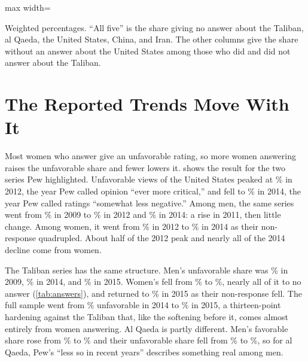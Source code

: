 \documentclass[11pt,letterpaper]{article}
\newcommand{\TableStyle}{\normalsize\setlength{\tabcolsep}{6pt}\renewcommand{\arraystretch}{1}}
\newcommand{\tablenote}[1]{\par\smallskip\begin{minipage}{\linewidth}\footnotesize #1\end{minipage}}
\begin{document}
\begin{table}[htbp]
\centering\TableStyle
\caption{Non-response across questions, by respondent}
\label{tab:same}
\begin{adjustbox}{max width=\linewidth}

\end{adjustbox}
\tablenote{Weighted percentages. ``All five'' is the share giving no answer about the Taliban, al Qaeda, the United States, China, and Iran. The other columns give the share without an answer about the United States among those who did and did not answer about the Taliban.}
\end{table}

\section{The Reported Trends Move With It}

Most women who answer give an unfavorable rating, so more women answering raises the unfavorable share and fewer lowers it.  shows the result for the two series Pew highlighted. Unfavorable views of the United States peaked at \USUnfavPeak{}\% in 2012, the year Pew called opinion ``ever more critical,'' and fell to \USUnfav{}\% in 2014, the year Pew called ratings ``somewhat less negative.'' Among men, the same series went from \MenUSUnfavOld{}\% in 2009 to \MenUSUnfavPeak{}\% in 2012 and \MenUSUnfav{}\% in 2014: a rise in 2011, then little change. Among women, it went from \WomenUSUnfavPeak{}\% in 2012 to \WomenUSUnfav{}\% in 2014 as their non-response quadrupled. About half of the 2012 peak and nearly all of the 2014 decline come from women.

The Taliban series has the same structure. Men's unfavorable share was \MenTalibanUnfavOld{}\% in 2009, \MenTalibanUnfav{}\% in 2014, and \MenTalibanUnfavLast{}\% in 2015. Women's fell from \WomenTalibanUnfavOld{}\% to \WomenTalibanUnfav{}\%, nearly all of it to no answer (\cref{tab:answers}), and returned to \WomenTalibanUnfavLast{}\% in 2015 as their non-response fell. The full sample went from \TalibanUnfav{}\% unfavorable in 2014 to \TalibanUnfavLast{}\% in 2015, a thirteen-point hardening against the Taliban that, like the softening before it, comes almost entirely from women answering. Al Qaeda is partly different. Men's favorable share rose from \MenQaedaFavOld{}\% to \MenQaedaFav{}\% and their unfavorable share fell from \MenQaedaUnfavOld{}\% to \MenQaedaUnfav{}\%, so for al Qaeda, Pew's ``less so in recent years'' describes something real among men.
\end{document}
